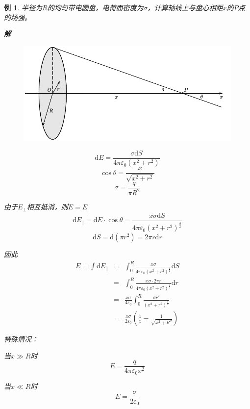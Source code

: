 \documentclass[12pt, a4paper, twoside]{ctexbook}
\newtheorem{example}[theorem]{例}
\begin{document}
\newpage
\begin{example}
    半径为$R$的均匀带电圆盘，电荷面密度为$\sigma$，计算轴线上与盘心相距$x$的$P$点的场强。

    \noindent\textbf{解}
    \begin{figure}[H]
        \centerline{\includegraphics[scale=1.0]{CH09EX03.pdf}}
    \end{figure}
    $$
    \mathrm{d}E=\frac{\sigma \mathrm{d}S}{4\pi\varepsilon_0\left(x^2+r^2\right)}
    $$
    $$
    \cos\theta=\frac{x}{\sqrt{x^2+r^2}}
    $$
    $$
    \sigma=\frac{q}{\pi R^2}
    $$
    
    由于$E_\bot$相互抵消，则$E=E_\parallel$
    $$
    \mathrm{d}E_\parallel=\mathrm{d}E\cdot\cos\theta=\frac{x\sigma\mathrm{d}S}{4\pi\varepsilon_0\left(x^2+r^2\right)^{\frac{3}{2}}}
    $$
    $$
    \mathrm{d}S=\mathrm{d}\left(\pi r^2\right)=2\pi r\mathrm{d}r
    $$
    
    因此
    \begin{eqnarray}
        E=\int\mathrm{d}E_\parallel &=&\int_{0}^{R}\frac{x\sigma}{4\pi\varepsilon_0\left(x^2+r^2\right)^{\frac{3}{2}}}\mathrm{d}S \nonumber \\
        ~&=&\int_{0}^{R}\frac{x\sigma\cdot 2\pi r}{4\pi\varepsilon_0\left(x^2+r^2\right)^{\frac{3}{2}}}\mathrm{d}r \nonumber \\
        ~&=&\frac{x\sigma}{4\varepsilon_0}\int_{0}^{R}\frac{\mathrm{d}r^2}{\left(x^2+r^2\right)^{\frac{3}{2}}} \nonumber \\
        ~&=&\frac{x\sigma}{2\varepsilon_0}\left(\frac{1}{x}-\frac{1}{\sqrt{x^2+R^2}}\right) \nonumber
    \end{eqnarray}
    
    {\sonti 特殊情况}：
    
    当$x\gg R$时
    $$
    E=\frac{q}{4\pi\varepsilon_0x^2}
    $$

    当$x\ll R$时
    $$
    E=\frac{\sigma}{2\varepsilon_0}
    $$
\end{example}
\end{document}
